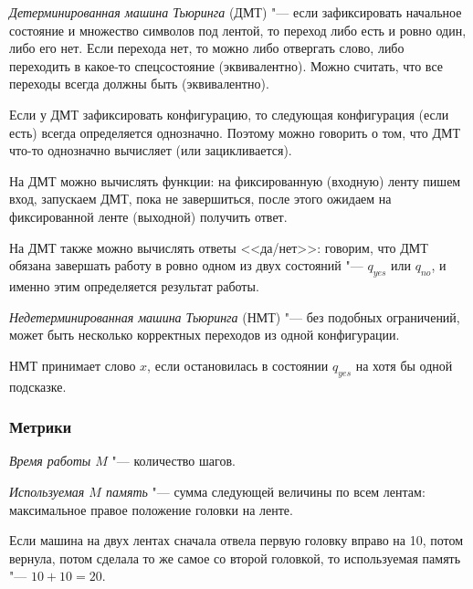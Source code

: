 	\begin{Def}
		\textit{Детерминированная машина Тьюринга} (ДМТ) "--- если зафиксировать начальное состояние и множество символов под лентой, то переход либо есть и ровно один, либо его нет.
		Если перехода нет, то можно либо отвергать слово, либо переходить в какое-то спецсостояние (эквивалентно).
		Можно считать, что все переходы всегда должны быть (эквивалентно).
	\end{Def}
	\begin{Rem}
		Если у ДМТ зафиксировать конфигурацию, то следующая конфигурация (если есть) всегда определяется однозначно.
		Поэтому можно говорить о том, что ДМТ что-то однозначно вычисляет (или зацикливается).
	\end{Rem}
	\begin{Def}
		На ДМТ можно вычислять функции: на фиксированную (входную) ленту пишем вход, запускаем ДМТ, пока не завершиться, после этого ожидаем на фиксированной ленте (выходной) получить ответ.
	\end{Def}
	\begin{Def}
		На ДМТ также можно вычислять ответы <<да/нет>>: говорим, что ДМТ обязана завершать работу в ровно одном из двух состояний "--- $q_{yes}$ или $q_{no}$, и именно этим определяется результат работы.
	\end{Def}

	\begin{Def}
		\textit{Недетерминированная машина Тьюринга} (НМТ) "--- без подобных ограничений, может быть несколько корректных переходов из одной конфигурации.
	\end{Def}
	\begin{Def}
		НМТ принимает слово $x$, если остановилась в состоянии $q_{yes}$ на хотя бы одной подсказке.
	\end{Def}

\subsubsection{Метрики}
	\begin{Def}
		\textit{Время работы $M$} "--- количество шагов.
	\end{Def}
	\begin{Def}
		\textit{Используемая $M$ память} "--- сумма следующей величины по всем лентам: максимальное правое положение головки на ленте.
	\end{Def}
	\begin{exmp}
		Если машина на двух лентах сначала отвела первую головку вправо на 10, потом вернула, потом сделала то же самое со второй головкой,
		то используемая память "--- $10+10=20$.
	\end{exmp}

